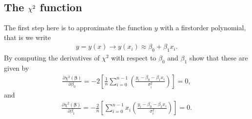 \documentclass[letterpaper,10pt,english]{sphinxmanual}
\begin{document}
\subsection{The \protect\(\chi^2\protect\) function}
\label{\detokenize{chapter4:id7}}
The first step here is to approximate the function \(y\) with a first\sphinxhyphen{}order polynomial, that is we write
\begin{equation*}
\begin{split}
y=y(x) \rightarrow y(x_i) \approx \beta_0+\beta_1 x_i.
\end{split}
\end{equation*}
By computing the derivatives of \(\chi^2\) with respect to \(\beta_0\) and \(\beta_1\) show that these are given by
\begin{equation*}
\begin{split}
\frac{\partial \chi^2(\boldsymbol{\beta})}{\partial \beta_0} = -2\left[ \frac{1}{n}\sum_{i=0}^{n-1}\left(\frac{y_i-\beta_0-\beta_1x_{i}}{\sigma_i^2}\right)\right]=0,
\end{split}
\end{equation*}
and
\begin{equation*}
\begin{split}
\frac{\partial \chi^2(\boldsymbol{\beta})}{\partial \beta_1} = -\frac{2}{n}\left[ \sum_{i=0}^{n-1}x_i\left(\frac{y_i-\beta_0-\beta_1x_{i}}{\sigma_i^2}\right)\right]=0.
\end{split}
\end{equation*}
\end{document}
